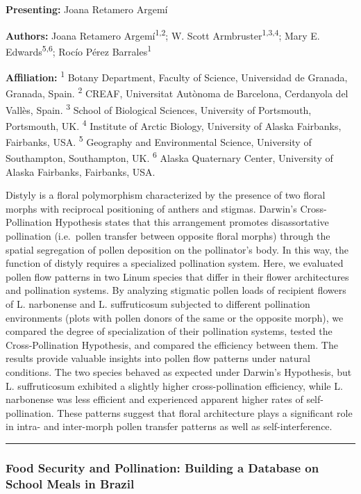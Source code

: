 \documentclass[
  letterpaper,
  DIV=11,
  numbers=noendperiod]{scrartcl}
\begin{document}
\textbf{Presenting:} Joana Retamero Argemí

\textbf{Authors:} Joana Retamero Argemí\textsuperscript{1,2}; W. Scott
Armbruster\textsuperscript{1,3,4}; Mary E. Edwards\textsuperscript{5,6};
Rocío Pérez Barrales\textsuperscript{1}

\textbf{Affiliation:} \textsuperscript{1} Botany Department, Faculty of
Science, Universidad de Granada, Granada, Spain. \textsuperscript{2}
CREAF, Universitat Autònoma de Barcelona, Cerdanyola del Vallès, Spain.
\textsuperscript{3} School of Biological Sciences, University of
Portsmouth, Portsmouth, UK. \textsuperscript{4} Institute of Arctic
Biology, University of Alaska Fairbanks, Fairbanks, USA.
\textsuperscript{5} Geography and Environmental Science, University of
Southampton, Southampton, UK. \textsuperscript{6} Alaska Quaternary
Center, University of Alaska Fairbanks, Fairbanks, USA.

Distyly is a floral polymorphism characterized by the presence of two
floral morphs with reciprocal positioning of anthers and stigmas.
Darwin's Cross-Pollination Hypothesis states that this arrangement
promotes disassortative pollination (i.e.~pollen transfer between
opposite floral morphs) through the spatial segregation of pollen
deposition on the pollinator's body. In this way, the function of
distyly requires a specialized pollination system. Here, we evaluated
pollen flow patterns in two Linum species that differ in their flower
architectures and pollination systems. By analyzing stigmatic pollen
loads of recipient flowers of L. narbonense and L. suffruticosum
subjected to different pollination environments (plots with pollen
donors of the same or the opposite morph), we compared the degree of
specialization of their pollination systems, tested the
Cross-Pollination Hypothesis, and compared the efficiency between them.
The results provide valuable insights into pollen flow patterns under
natural conditions. The two species behaved as expected under Darwin's
Hypothesis, but L. suffruticosum exhibited a slightly higher
cross-pollination efficiency, while L. narbonense was less efficient and
experienced apparent higher rates of self-pollination. These patterns
suggest that floral architecture plays a significant role in intra- and
inter-morph pollen transfer patterns as well as self-interference.

\begin{center}\rule{0.5\linewidth}{0.5pt}\end{center}

\subsubsection{Food Security and Pollination: Building a Database on
School Meals in
Brazil}\label{food-security-and-pollination-building-a-database-on-school-meals-in-brazil}
\end{document}

